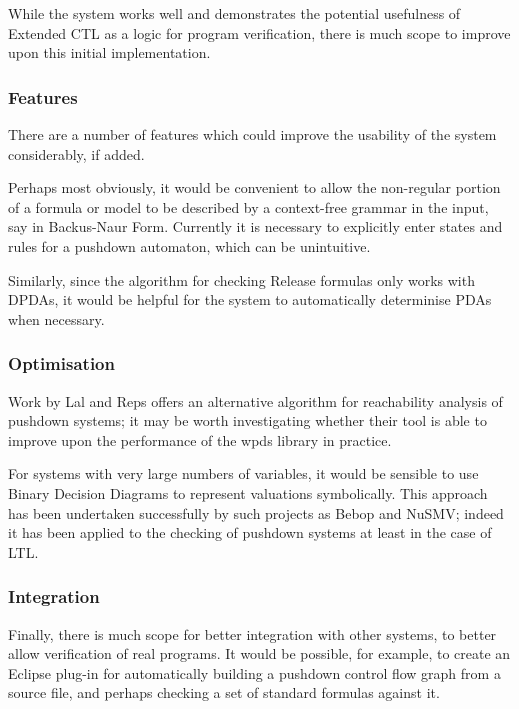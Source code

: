 \documentclass[11pt]{article}
\theoremstyle{definition}
\begin{document}
While the system works well and demonstrates the potential usefulness of
Extended CTL as a logic for program verification, there is much scope to
improve upon this initial implementation. 

\subsubsection{Features}
There are a number of features which could improve the usability of the system
considerably, if added.

Perhaps most obviously, it would be convenient to allow the non-regular portion
of a formula or model to be described by a context-free grammar in the input,
say in Backus-Naur Form.  Currently it is necessary to explicitly enter states
and rules for a pushdown automaton, which can be unintuitive. 

Similarly, since the algorithm for checking Release formulas only works with
DPDAs, it would be helpful for the system to automatically determinise PDAs
when necessary.

\subsubsection{Optimisation}

Work by Lal and Reps\cite{lal2006improving} offers an alternative algorithm for
reachability analysis of pushdown systems; it may be worth investigating
whether their tool is able to improve upon the performance of the wpds library
in practice.

For systems with very large numbers of variables, it would be sensible to use
Binary Decision Diagrams to represent valuations symbolically. 
This approach has been undertaken successfully by such projects as
Bebop\cite{ball2000bebop} and NuSMV\cite{cimatti2002nusmv}; indeed it has been
applied to the checking of pushdown systems at least in the case of
LTL\cite{esparza2001bdd}.

\subsubsection{Integration}

Finally, there is much scope for better integration with other systems, to
better allow verification of real programs. It would be possible, for example,
to create an Eclipse plug-in for automatically building a pushdown control flow
graph from a source file, and perhaps checking a set of standard formulas
against it.
\end{document}
